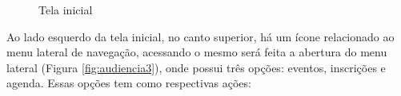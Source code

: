 \begin{figure}[H]
    \centering
    \caption{Tela inicial}
    \label{fig:audiencia2}
\end{figure}

Ao lado esquerdo da tela inicial, no canto superior, há um ícone relacionado ao menu lateral de navegação, acessando o mesmo será feita a abertura do menu lateral (Figura \ref{fig:audiencia3}), onde possui três opções: eventos, inscrições e agenda. Essas opções tem como respectivas ações:

